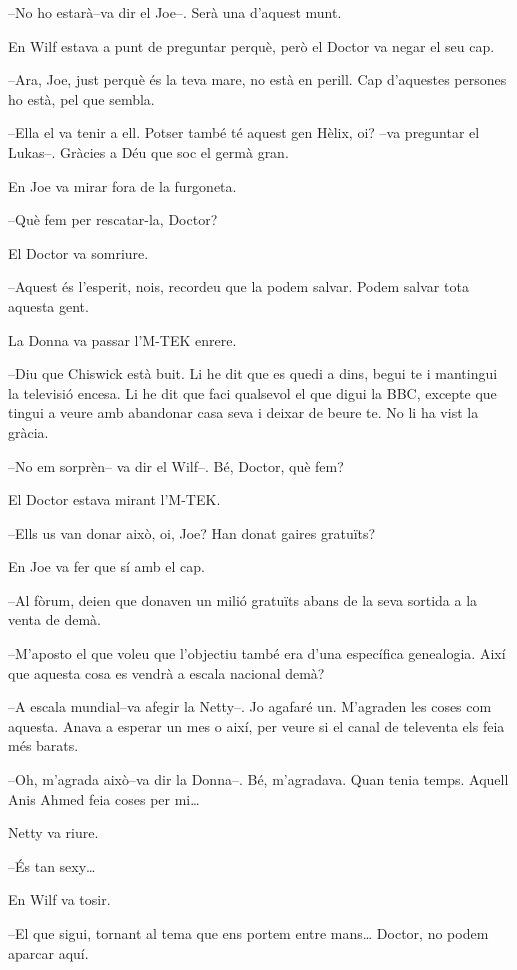 --No ho estarà--va dir el Joe--. Serà una d'aquest munt.

En Wilf estava a punt de preguntar perquè, però el Doctor va negar el
seu cap.

--Ara, Joe, just perquè és la teva mare, no està en perill. Cap
d'aquestes persones ho està, pel que sembla.

--Ella el va tenir a ell. Potser també té aquest gen Hèlix, oi? --va
preguntar el Lukas--. Gràcies a Déu que soc el germà gran.

En Joe va mirar fora de la furgoneta.

--Què fem per rescatar-la, Doctor?

El Doctor va somriure.

--Aquest és l'esperit, nois, recordeu que la podem salvar. Podem salvar
tota aquesta gent.

La Donna va passar l'M-TEK enrere.

--Diu que Chiswick està buit. Li he dit que es quedi a dins, begui te i
mantingui la televisió encesa. Li he dit que faci qualsevol el que digui
la BBC, excepte que tingui a veure amb abandonar casa seva i deixar de
beure te. No li ha vist la gràcia.

--No em sorprèn-- va dir el Wilf--. Bé, Doctor, què fem?

El Doctor estava mirant l'M-TEK.

--Ells us van donar això, oi, Joe? Han donat gaires gratuïts?

En Joe va fer que sí amb el cap.

--Al fòrum, deien que donaven un milió gratuïts abans de la seva sortida
a la venta de demà.

--M'aposto el que voleu que l'objectiu també era d'una específica
genealogia. Així que aquesta cosa es vendrà a escala nacional demà?

--A escala mundial--va afegir la Netty--. Jo agafaré un. M'agraden les
coses com aquesta. Anava a esperar un mes o així, per veure si el canal
de televenta els feia més barats.

--Oh, m'agrada això--va dir la Donna--. Bé, m'agradava. Quan tenia
temps. Aquell Anis Ahmed feia coses per mi\ldots{}

Netty va riure.

--És tan sexy\ldots{}

En Wilf va tosir.

--El que sigui, tornant al tema que ens portem entre mans\ldots{}
Doctor, no podem aparcar aquí.

